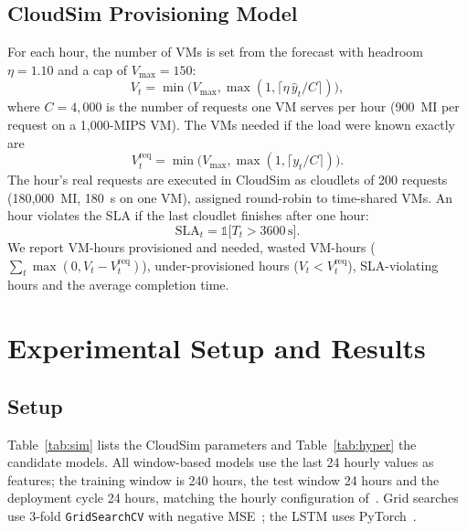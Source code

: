 \documentclass[journal,onecolumn,11pt]{IEEEtran}
\begin{document}
\subsection{CloudSim Provisioning Model}
For each hour, the number of VMs is set from the forecast with headroom $\eta=1.10$ and a cap of $V_{\max}=150$:
\begin{equation}
V_t=\min\!\big(V_{\max},\max(1,\lceil \eta\,\hat{y}_t/C\rceil)\big),
\end{equation}
where $C=4{,}000$ is the number of requests one VM serves per hour (900~MI per request on a 1,000-MIPS VM). The VMs needed if the load were known exactly are
\begin{equation}
V^{\mathrm{req}}_t=\min\!\big(V_{\max},\max(1,\lceil y_t/C\rceil)\big).
\end{equation}
The hour's real requests are executed in CloudSim as cloudlets of 200 requests (180,000~MI, 180~s on one VM), assigned round-robin to time-shared VMs. An hour violates the SLA if the last cloudlet finishes after one hour:
\begin{equation}
\mathrm{SLA}_t=\mathbb{1}\big[T_t>3600\,\mathrm{s}\big].
\end{equation}
We report VM-hours provisioned and needed, wasted VM-hours ($\sum_t\max(0,V_t-V^{\mathrm{req}}_t)$), under-provisioned hours ($V_t<V^{\mathrm{req}}_t$), SLA-violating hours and the average completion time.

\section{Experimental Setup and Results}\label{sec:results}

\subsection{Setup}
Table~\ref{tab:sim} lists the CloudSim parameters and Table~\ref{tab:hyper} the candidate models. All window-based models use the last 24 hourly values as features; the training window is 240 hours, the test window 24 hours and the deployment cycle 24 hours, matching the hourly configuration of~\cite{nashaat2026}. Grid searches use 3-fold \texttt{GridSearchCV} with negative MSE~\cite{pedregosa2011}; the LSTM uses PyTorch~\cite{paszke2019}.
\end{document}
